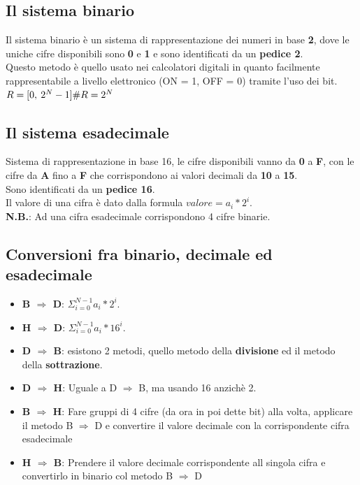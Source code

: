 \documentclass{report}
\begin{document}
    \subsection{Il sistema binario}
        Il sistema binario è un sistema di rappresentazione dei numeri in base
        \textbf{2}, dove le uniche cifre disponibili sono \textbf{0} e \textbf{1} 
        e sono identificati da un \textbf{pedice 2}. \\
        Questo metodo è quello usato nei calcolatori digitali in quanto facilmente
        rappresentabile a livello elettronico (ON = 1, OFF = 0) tramite l'uso dei bit. \\
        $R = [0, \: 2^N - 1] \\
        \#R = 2^N$
    \subsection{Il sistema esadecimale}
        Sistema di rappresentazione in base 16, le cifre disponibili vanno da
        \textbf{0} a \textbf{F}, con le cifre da \textbf{A} fino a \textbf{F}
        che corrispondono ai valori decimali da \textbf{10} a \textbf{15}. \\
        Sono identificati da un \textbf{pedice 16}. \\
        Il valore di una cifra è dato dalla formula $valore = a_i * 2^i$. \\
        \textbf{N.B.}: Ad una cifra esadecimale corrispondono 4 cifre binarie.
    \subsection{Conversioni fra binario, decimale ed esadecimale}
        \begin{itemize}
            \item \textbf{B $\Longrightarrow$ D}: $\Sigma_{i=0}^{N-1} a_i * 2^i$.
            \item \textbf{H $\Longrightarrow$ D}: $\Sigma_{i=0}^{N-1} a_i * 16^i$.
            \item \textbf{D $\Longrightarrow$ B}: esistono 2 metodi, quello metodo della \textbf{divisione} 
                ed il metodo della \textbf{sottrazione}.
            \item \textbf{D $\Longrightarrow$ H}: Uguale a D $\Longrightarrow$ B, ma usando 16 anzichè 2.
            \item \textbf{B $\Longrightarrow$ H}: Fare gruppi di 4 cifre (da ora in poi dette bit) alla volta, 
                applicare il metodo B $\Longrightarrow$ D e convertire il valore decimale 
                con la corrispondente cifra esadecimale
            \item \textbf{H $\Longrightarrow$ B}: Prendere il valore decimale corrispondente all singola cifra e
                convertirlo in binario col metodo B $\Longrightarrow$ D 
        \end{itemize}
\end{document}
